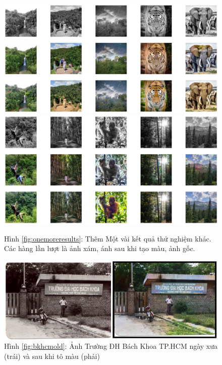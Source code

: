 \documentclass[a4paper, 12pt]{article}
\begin{document}
\begin{figure}[!h]
\captionsetup{width=0.8\textwidth}
\centering
\includegraphics[width=15cm]{images/demo3.png}
\includegraphics[width=15cm]{images/demo4.png}
\caption*{Hình \ref{fig:onemoreresults}: Thêm Một vài kết quả thử nghiệm khác. Các hàng lần lượt là ảnh xám, ánh sau khi tạo màu, ảnh gốc.}
\end{figure}

\begin{figure}[!h]
\centering
\includegraphics[width=15cm]{images/5_1.PNG}
\caption*{Hình \ref{fig:bkhcmold}: Ảnh Trường ĐH Bách Khoa TP.HCM ngày xưa (trái) và sau khi tô màu (phải)}
\end{figure}

\clearpage

\renewcommand{\refname}{Tài liệu tham khảo}

\printbibliography
\end{document}
